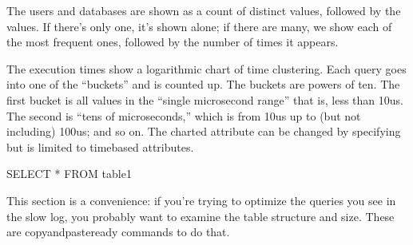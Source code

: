 \documentclass[letterpaper,10pt,english]{sphinxmanual}
\begin{document}
\sphinxAtStartPar
The users and databases are shown as a count of distinct values, followed by the
values.  If there’s only one, it’s shown alone; if there are many, we show each
of the most frequent ones, followed by the number of times it appears.

\begin{sphinxVerbatim}[commandchars=\\\{\}]
\end{sphinxVerbatim}

\sphinxAtStartPar
The execution times show a logarithmic chart of time clustering.  Each query
goes into one of the “buckets” and is counted up.  The buckets are powers of
ten.  The first bucket is all values in the “single microsecond range” \textendash{} that
is, less than 10us.  The second is “tens of microseconds,” which is from 10us
up to (but not including) 100us; and so on.  The charted attribute can be
changed by specifying {\hyperref[\detokenize{mariadb-query-digest:cmdoption-mariadb-query-digest-report-histogram}]{}} but is limited to time\sphinxhyphen{}based
attributes.

\begin{sphinxVerbatim}[commandchars=\\\{\}]
SELECT * FROM table1
\end{sphinxVerbatim}

\sphinxAtStartPar
This section is a convenience: if you’re trying to optimize the queries you see
in the slow log, you probably want to examine the table structure and size.
These are copy\sphinxhyphen{}and\sphinxhyphen{}paste\sphinxhyphen{}ready commands to do that.
\end{document}
